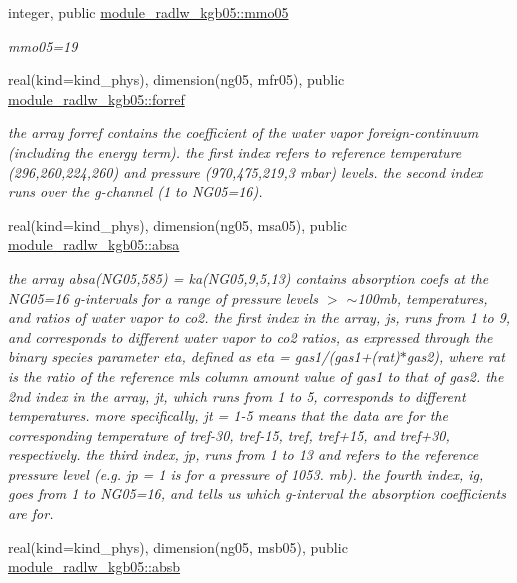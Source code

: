 \begin{DoxyCompactItemize}
integer, public \hyperlink{group__module__radlw__kgbnn_gaa552aae4878030144218ca6c2bbe417f}{module\+\_\+radlw\+\_\+kgb05\+::mmo05}
\begin{DoxyCompactList}\small\item\em mmo05=19 \end{DoxyCompactList}\item 
real(kind=kind\+\_\+phys), dimension(ng05, mfr05), public \hyperlink{group__module__radlw__kgbnn_ga6ff0c311db14b41c9bdf1170164adc3a}{module\+\_\+radlw\+\_\+kgb05\+::forref}
\begin{DoxyCompactList}\small\item\em the array forref contains the coefficient of the water vapor foreign-\/continuum (including the energy term). the first index refers to reference temperature (296,260,224,260) and pressure (970,475,219,3 mbar) levels. the second index runs over the g-\/channel (1 to N\+G05=16). \end{DoxyCompactList}\item 
real(kind=kind\+\_\+phys), dimension(ng05, msa05), public \hyperlink{group__module__radlw__kgbnn_ga30ce809b40dd99b3219996ac8f023274}{module\+\_\+radlw\+\_\+kgb05\+::absa}
\begin{DoxyCompactList}\small\item\em the array absa(\+N\+G05,585) = ka(\+N\+G05,9,5,13) contains absorption coefs at the N\+G05=16 g-\/intervals for a range of pressure levels $>$ $\sim$100mb, temperatures, and ratios of water vapor to co2. the first index in the array, js, runs from 1 to 9, and corresponds to different water vapor to co2 ratios, as expressed through the binary species parameter eta, defined as eta = gas1/(gas1+(rat)$\ast$gas2), where rat is the ratio of the reference mls column amount value of gas1 to that of gas2. the 2nd index in the array, jt, which runs from 1 to 5, corresponds to different temperatures. more specifically, jt = 1-\/5 means that the data are for the corresponding temperature of tref-\/30, tref-\/15, tref, tref+15, and tref+30, respectively. the third index, jp, runs from 1 to 13 and refers to the reference pressure level (e.\+g. jp = 1 is for a pressure of 1053. mb). the fourth index, ig, goes from 1 to N\+G05=16, and tells us which g-\/interval the absorption coefficients are for. \end{DoxyCompactList}\item 
real(kind=kind\+\_\+phys), dimension(ng05, msb05), public \hyperlink{group__module__radlw__kgbnn_gaebc667b0569824bba455e822eaea6112}{module\+\_\+radlw\+\_\+kgb05\+::absb}

\end{DoxyCompactItemize}

